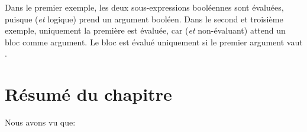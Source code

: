 \documentclass[a4paper,10pt,twoside]{book}
\begin{document}
Dans le premier exemple, les deux sous-expressions bool\'eennes sont
\'evalu\'ees, puisque  
(\emph{et} logique) 
prend un argument bool\'een.
Dans le second et troisi\`eme exemple, uniquement la premi\`ere est
\'evalu\'ee, car  
(\emph{et} non-\'evaluant) 
attend un bloc comme argument. Le  bloc est \'evalu\'e uniquement si le premier argument vaut .


\section{R\'esum\'e du chapitre}
Nous avons vu que:
\end{document}
